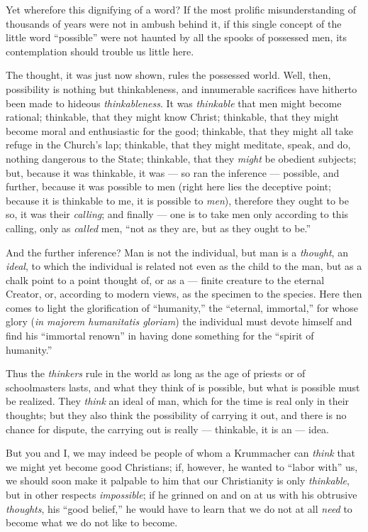 Yet wherefore this dignifying of a word? If the most prolific misunderstanding 
of thousands of years were not in ambush behind it, if this single concept of 
the little word ``possible'' were not haunted by all the spooks of possessed 
men, its contemplation should trouble us little here.

The thought, it was just now shown, rules the possessed world. Well, then, 
possibility is nothing but thinkableness, and innumerable sacrifices have 
hitherto been made to hideous \textit{thinkableness}. It was 
\textit{thinkable} that men might become rational; thinkable, that they might 
know Christ; thinkable, that they might become moral and enthusiastic for the 
good; thinkable, that they might all take refuge in the Church's lap; 
thinkable, that they might meditate, speak, and do, nothing dangerous to the 
State; thinkable, that they \textit{might} be obedient subjects; but, because 
it was thinkable, it was --- so ran the inference --- possible, and further, 
because it was possible to men (right here lies the deceptive point; because 
it is thinkable to me, it is possible to \textit{men}), therefore they ought 
to be so, it was their \textit{calling}; and finally --- one is to take men 
only according to this calling, only as \textit{called} men, ``not as they 
are, but as they ought to be.''

And the further inference? Man is not the individual, but man is a 
\textit{thought}, an \textit{ideal}, to which the individual is related not 
even as the child to the man, but as a chalk point to a point thought of, or 
as a --- finite creature to the eternal Creator, or, according to modern views, 
as the specimen to the species. Here then comes to light the glorification of 
``humanity,'' the ``eternal, immortal,'' for whose glory (\textit{in 
majorem humanitatis gloriam}) the individual must devote himself and find his 
``immortal renown'' in having done something for the ``spirit of 
humanity.''

Thus the \textit{thinkers} rule in the world as long as the age of priests or 
of schoolmasters lasts, and what they think of is possible, but what is 
possible must be realized. They \textit{think} an ideal of man, which for the 
time is real only in their thoughts; but they also think the possibility of 
carrying it out, and there is no chance for dispute, the carrying out is 
really --- thinkable, it is an --- idea.

But you and I, we may indeed be people of whom a Krummacher can \textit{think} 
that we might yet become good Christians; if, however, he wanted to ``labor 
with'' us, we should soon make it palpable to him that our Christianity is 
only \textit{thinkable}, but in other respects \textit{impossible}; if he 
grinned on and on at us with his obtrusive \textit{thoughts}, his ``good 
belief,'' he would have to learn that we do not at all \textit{need} to 
become what we do not like to become.

